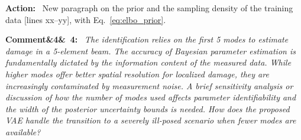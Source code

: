\documentclass[11pt]{article}
\newenvironment{rcomment}[1]{\par\bigskip\noindent\textbf{Comment\ifx&#1&\else\ #1\fi:}\ \itshape}{\par}
\newenvironment{action}{\par\smallskip\noindent\color{resp}\textbf{Action:}\ }{\par}
\newcommand{\tbd}[1]{\textcolor{note}{\textsf{[#1]}}}
\newcommand{\lines}[1]{\tbd{lines #1}}
\begin{document}
\begin{action}
New paragraph on the prior and the sampling density of the training data \lines{xx--yy}, with
Eq.~\eqref{eq:elbo_prior}.
\end{action}

\begin{rcomment}{4}
The identification relies on the first 5 modes to estimate damage in a 5-element beam. The accuracy of Bayesian
parameter estimation is fundamentally dictated by the information content of the measured data. While higher modes
offer better spatial resolution for localized damage, they are increasingly contaminated by measurement noise. A brief
sensitivity analysis or discussion of how the number of modes used affects parameter identifiability and the width of
the posterior uncertainty bounds is needed. How does the proposed VAE handle the transition to a severely ill-posed
scenario when fewer modes are available?
\end{rcomment}
\end{document}
